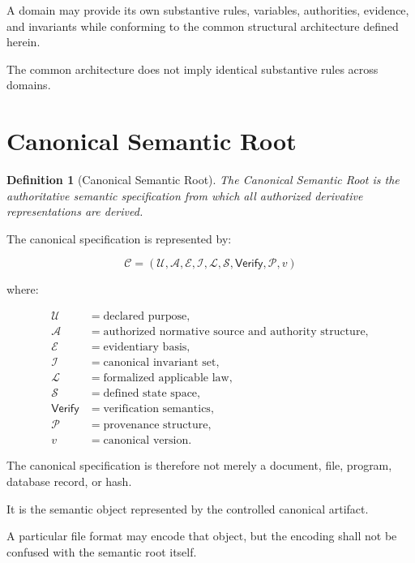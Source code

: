 \documentclass[11pt]{article}
\newcommand{\Purpose}{\mathcal{U}}
\newcommand{\Authority}{\mathcal{A}}
\newcommand{\Evidence}{\mathcal{E}}
\newcommand{\Inv}{\mathcal{I}}
\newcommand{\State}{\mathcal{S}}
\newcommand{\Law}{\mathcal{L}}
\newcommand{\Prov}{\mathcal{P}}
\newcommand{\Spec}{\mathcal{C}}
\newcommand{\Verify}{\mathsf{Verify}}
\newtheorem{definition}{Definition}
\begin{document}
A domain may provide its own substantive rules, variables,
authorities, evidence, and invariants while conforming to the
common structural architecture defined herein.

The common architecture does not imply identical substantive
rules across domains.

\section{Canonical Semantic Root}

\begin{definition}[Canonical Semantic Root]
The \emph{Canonical Semantic Root} is the authoritative semantic
specification from which all authorized derivative
representations are derived.
\end{definition}

The canonical specification is represented by:

\[
\boxed{
\Spec =
(
\Purpose,
\Authority,
\Evidence,
\Inv,
\Law,
\State,
\Verify,
\Prov,
v
)
}
\]

where:

\begin{align*}
\Purpose &= \text{declared purpose},\\
\Authority &= \text{authorized normative source and authority structure},\\
\Evidence &= \text{evidentiary basis},\\
\Inv &= \text{canonical invariant set},\\
\Law &= \text{formalized applicable law},\\
\State &= \text{defined state space},\\
\Verify &= \text{verification semantics},\\
\Prov &= \text{provenance structure},\\
v &= \text{canonical version}.
\end{align*}

The canonical specification is therefore not merely a document,
file, program, database record, or hash.

It is the semantic object represented by the controlled
canonical artifact.

A particular file format may encode that object, but the encoding
shall not be confused with the semantic root itself.

\end{document}

